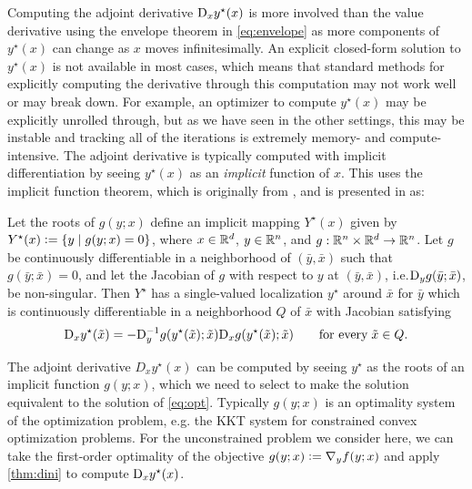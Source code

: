 \documentclass[twoside,11pt]{article}
\newcommand{\eg}{e.g.\xspace}
\newcommand{\ie}{i.e.\xspace}
\begin{document}
Computing the adjoint derivative $\mathrm{D}_x y^\star(x)$ is more involved
than the value derivative using the envelope theorem
in \cref{eq:envelope} as more components of $y^\star(x)$
can change as $x$ moves infinitesimally.
An explicit closed-form solution to $y^\star(x)$ is
not available in most cases, which means that standard
methods for explicitly computing the derivative through
this computation may not work well or may break down.
For example, an optimizer to compute $y^\star(x)$ may be
explicitly unrolled through, but as we have seen in the
other settings, this may be instable and tracking all
of the iterations is extremely memory- and
compute-intensive.
The adjoint derivative is typically computed with implicit
differentiation by seeing $y^\star(x)$ as an \emph{implicit}
function of $x$.
This uses the implicit function theorem,
which is originally from \citet{dini1878analisi},
and is presented in \citet[Theorem 1B.1]{dontchev2009implicit} as:
\begin{theorem}
  \label{thm:dini}
  Let the roots of $g(y; x)$ define an implicit
  mapping $Y^\star(x)$ given by $Y^\star(x)\vcentcolon=\{y \mid g(y;x)=0\}$,
  where $x\in\mathbb{R}^d$, $y\in\mathbb{R}^n$, and
  $g: \mathbb{R}^n\times\mathbb{R}^d\rightarrow\mathbb{R}^n$.
  Let $g$ be continuously differentiable in a neighborhood of $(\bar y, \bar x)$
  such that $g(\bar y; \bar x)=0$, and let the Jacobian of $g$
  with respect to $y$ at $(\bar y, \bar x)$,
  \ie $\mathrm{D}_y g(\bar y; \bar x)$, be non-singular.
  Then $Y^\star$ has a single-valued localization $y^\star$
  around $\bar x$ for $\bar y$ which is continuously differentiable
  in a neighborhood $Q$ of $\bar x$ with Jacobian satisfying
  \begin{equation}
    \mathrm{D}_x y^\star(\tilde x) = -\mathrm{D}_y^{-1} g(y^\star(\tilde x); \tilde x) \mathrm{D}_x g(y^\star(\tilde x); \tilde x)
    \qquad \mathrm{for\ every}\; \tilde x\in Q.
    \label{eq:implicit-derivative}
  \end{equation}
\end{theorem}

The adjoint derivative $D_x y^\star(x)$ can be computed
by seeing $y^\star$ as the roots of an implicit
function $g(y;x)$, which we need to select to
make the solution equivalent to the solution
of \cref{eq:opt}.
Typically $g(y;x)$ is an optimality system of
the optimization problem, \eg the KKT system
for constrained convex optimization problems.
For the unconstrained problem we consider here,
we can take the first-order optimality of
the objective $g(y;x) \vcentcolon= \nabla_y f(y; x)$
and apply \cref{thm:dini} to compute
$\mathrm{D}_x y^\star(x)$.
\end{document}
